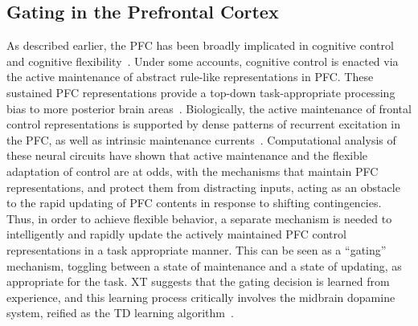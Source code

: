  
\subsection{Gating in the Prefrontal Cortex} 

As described earlier, the PFC has been broadly implicated in cognitive control and cognitive flexibility~\cite{Stuss:2000:WCSTLesion,Stuss:2001:StroopLesion}.  Under some accounts, cognitive control is enacted via the active maintenance of abstract rule-like representations in PFC.  These sustained PFC representations provide a top-down task-appropriate processing bias to more posterior brain areas~\cite{CohenJD:1990:Stroop}.  Biologically, the active maintenance of frontal control representations is supported by dense patterns of recurrent excitation in the PFC, as well as intrinsic maintenance currents~\cite{Goldman-RakicPS:1987:PFC_Maintenance}.  Computational analysis of these neural circuits have shown that active maintenance and the flexible adaptation of control are at odds, with the mechanisms that maintain PFC representations, and protect them from distracting inputs, acting as an obstacle to the rapid updating of PFC contents in response to shifting contingencies.  Thus, in order to achieve flexible behavior, a separate mechanism is needed to intelligently and rapidly update the actively maintained PFC control representations in a task appropriate manner.  This can be seen as a ``gating'' mechanism, toggling between a state of maintenance and a state of updating, as appropriate for the task.  XT suggests that the gating decision is learned from experience, and this learning process critically involves the midbrain dopamine system, reified as the TD learning algorithm~\cite{BraverTS:2000:Control,RougierNP:2005:XT,BartoAG:1994:TDLearning}.
